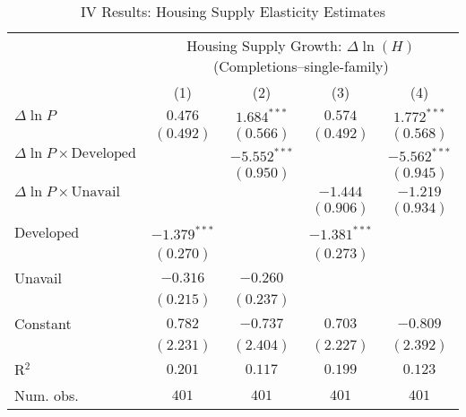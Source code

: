 
\begin{table}
\caption{IV Results: Housing Supply Elasticity Estimates}
\begin{center}
\begin{footnotesize}
\begin{threeparttable}
\begin{tabular}{l c c c c}
\toprule
 & \multicolumn{4}{c}{Housing Supply Growth: $\Delta\ln(H)$ (Completions--single-family)} \\
\cmidrule(lr){2-5}
 & (1) & (2) & (3) & (4) \\
\midrule
$\Delta\ln P$                         & $0.476$        & $1.684^{***}$  & $0.574$        & $1.772^{***}$  \\
                                      & $(0.492)$      & $(0.566)$      & $(0.492)$      & $(0.568)$      \\
$\Delta\ln P\times{\text{Developed}}$ &                & $-5.552^{***}$ &                & $-5.562^{***}$ \\
                                      &                & $(0.950)$      &                & $(0.945)$      \\
$\Delta\ln P\times{\text{Unavail}}$   &                &                & $-1.444$       & $-1.219$       \\
                                      &                &                & $(0.906)$      & $(0.934)$      \\
Developed                             & $-1.379^{***}$ &                & $-1.381^{***}$ &                \\
                                      & $(0.270)$      &                & $(0.273)$      &                \\
Unavail                               & $-0.316$       & $-0.260$       &                &                \\
                                      & $(0.215)$      & $(0.237)$      &                &                \\
Constant                              & $0.782$        & $-0.737$       & $0.703$        & $-0.809$       \\
                                      & $(2.231)$      & $(2.404)$      & $(2.227)$      & $(2.392)$      \\
\midrule
R$^2$                                 & $0.201$        & $0.117$        & $0.199$        & $0.123$        \\
Num. obs.                             & $401$          & $401$          & $401$          & $401$          \\

\end{tabular}
\end{threeparttable}
\end{footnotesize}
\end{center}
\end{table}
